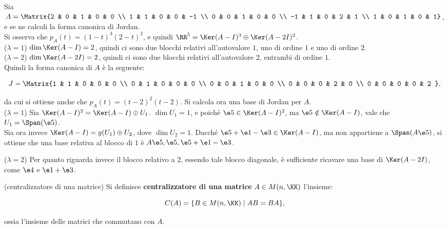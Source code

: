 \documentclass[11pt]{article}
\begin{document}
	\begin{example}
		Sia $A = \Matrix{2 & 0 & 1 & 0 & 0 \\ 1 & 1 & 0 & 0 & -1 \\ 0 & 0 & 1 & 0 & 0 \\ -1 & 1 & 0 & 2 & 1 \\ 1 & 0 & 1 & 0 & 1}$, e se ne calcoli la forma canonica di Jordan. \\
		
		Si osserva che $p_A(t) = (1-t)^3 (2-t)^2$, e quindi
		$\RR^5 = \Ker (A - I)^3 \oplus \Ker (A - 2I)^2$. \\
		
		($\lambda = 1$) $\dim \Ker (A - I) = 2$, quindi ci sono due blocchi
		relativi all'autovalore $1$, uno di ordine $1$ e uno di ordine $2$. \\
		
		($\lambda = 2$) $\dim \Ker (A - 2I) = 2$, quindi ci sono due blocchi
		relativi all'autovalore $2$, entrambi di ordine $1$. \\
		
		Quindi la forma canonica di $A$ è la seguente:
		
		\[ J = \Matrix{1 & 1 & 0 & 0 & 0 \\ 0 & 1 & 0 & 0 & 0 \\ 0 & 0 & 1 & 0 & 0 \\ 0 & 0 & 0 & 2 & 0 \\ 0 & 0 & 0 & 0 & 2 }, \]
		
		da cui si ottiene anche che $p_A(t) = (t-2)^2 (t-2)$. Si calcola
		ora una base di Jordan per $A$. \\
		
		($\lambda = 1$) Sia $\Ker (A - I)^2 = \Ker (A - I) \oplus U_1$. $\dim U_1 = 1$,
		e poiché $\e5 \in \Ker (A - I)^2$, ma $\e5 \notin \Ker (A-I)$,
		vale che $U_1 = \Span(\e5)$. \\
		
		Sia ora invece $\Ker (A - I) = g(U_1) \oplus U_2$, dove
		$\dim U_2 = 1$. Dacché $\e5+\e1-\e3  \in \Ker (A-I)$, ma
		non appartiene a $\Span(A \e5)$, si ottiene che una base
		relativa al blocco di $1$ è $A \e5, \e5, \e5+\e1-\e3$.
		
		($\lambda = 2$) Per quanto riguarda invece il blocco relativo a $2$, essendo
		tale blocco diagonale, è sufficiente ricavare una base
		di $\Ker (A-2I)$, come $\e4$ e $\e1 + \e3$.
	\end{example}

	\begin{definition} (centralizzatore di una matrice)
		Si definisce \textbf{centralizzatore di una matrice} $A \in M(n, \KK)$
		l'insieme:
		
		\[ C(A) = \{ B \in M(n, \KK) \mid AB = BA\}, \]
		
		ossia l'insieme delle matrici che commutano con $A$.
	\end{definition}
\end{document}
